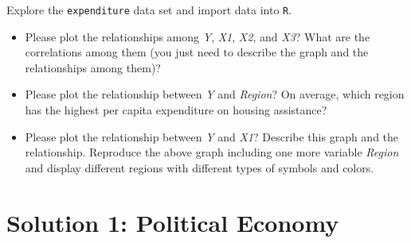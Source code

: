 \documentclass[12pt,letterpaper]{article}
\begin{document}
\vspace{.5cm}
\noindent Explore the \texttt{expenditure} data set and import data into \texttt{R}.
\vspace{.5cm}
  
\vspace{.5cm}
\begin{itemize}

\item
Please plot the relationships among \emph{Y}, \emph{X1}, \emph{X2}, and \emph{X3}? What are the correlations among them (you just need to describe the graph and the relationships among them)?
\vspace{.5cm}
\item
Please plot the relationship between \emph{Y} and \emph{Region}? On average, which region has the highest per capita expenditure on housing assistance?
\vspace{.5cm}
\item
Please plot the relationship between \emph{Y} and \emph{X1}? Describe this graph and the relationship. Reproduce the above graph including one more variable \emph{Region} and display different regions with different types of symbols and colors.
\end{itemize}

\newpage

\section*{Solution 1: Political Economy}
\end{document}
